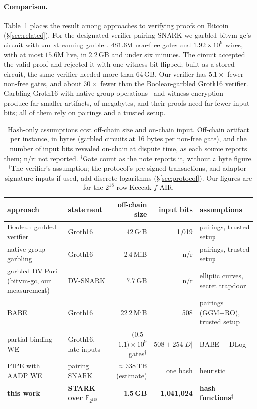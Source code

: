 \documentclass[11pt]{article}
\newcommand{\F}{\mathbb{F}_{2^{128}}}
\begin{document}
\paragraph{Comparison.} Table~\ref{tab:compare} places the result among
approaches to verifying proofs on Bitcoin (\S\ref{sec:related}). For the
designated-verifier pairing SNARK we garbled bitvm-gc's circuit with our
streaming garbler: $481.6$M non-free gates and $1.92\times10^9$ wires, with at
most $15.6$M live, in 2.2\,GB and under six minutes. The circuit accepted the
valid proof and rejected it with one witness bit flipped; built as a stored
circuit, the same verifier needed more than 64\,GB. Our verifier has
$5.1\times$ fewer non-free gates, and about $30\times$ fewer than the
Boolean-garbled Groth16 verifier. Garbling Groth16 with native group
operations~\cite{kflt26native} and witness encryption~\cite{babe2026} produce
far smaller artifacts, of megabytes, and their proofs need far fewer input bits;
all of them rely on pairings and a trusted setup.

\begin{table}[t]\centering\footnotesize\setlength{\tabcolsep}{4pt}
\begin{tabularx}{\textwidth}{>{\raggedright\arraybackslash}X>{\raggedright\arraybackslash}p{2.1cm}rr>{\raggedright\arraybackslash}p{3.2cm}}\toprule
approach & statement & off-chain size & input bits & assumptions\\\midrule
Boolean garbled verifier~\cite{bit25b} & Groth16 & 42\,GiB & 1{,}019 & pairings, trusted setup\\
native-group garbling~\cite{kflt26native} & Groth16 & 2.4\,MiB & n/r & pairings, trusted setup\\
garbled DV-Pari (bitvm-gc, our measurement) & DV-SNARK & 7.7\,GB & n/r & elliptic curves, secret trapdoor\\
BABE~\cite{babe2026} & Groth16 & 22.2\,MiB & 508 & pairings (GGM+RO), trusted setup\\
partial-binding WE~\cite{goatpbwe} & Groth16, late inputs & $(0.5$--$1.1)\times10^9$ gates$^{\dagger}$ & $508+254|D|$ & BABE + DLog\\
PIPE with AADP WE~\cite{pipesv2,aadp2026} & pairing SNARK & $\approx338$\,TB (estimate) & one hash & heuristic\\
\textbf{this work} & \textbf{STARK over $\F$} & \textbf{1.5\,GB} & \textbf{1{,}041{,}024} & \textbf{hash functions}$^{\ddagger}$\\\bottomrule
\end{tabularx}
\caption{Hash-only assumptions cost off-chain size and on-chain input. Off-chain
artifact per instance, in bytes (garbled circuits at 16 bytes per non-free gate),
and the number of input bits revealed on-chain at dispute time, as each source
reports them; n/r: not reported. $^{\dagger}$Gate count as the note reports it,
without a byte figure. $^{\ddagger}$The verifier's assumption; the protocol's
pre-signed transactions, and adaptor-signature inputs if used, add discrete
logarithms (\S\ref{sec:protocol}). Our figures are for the $2^{18}$-row
Keccak-$f$ AIR.}
\label{tab:compare}
\end{table}
\end{document}

